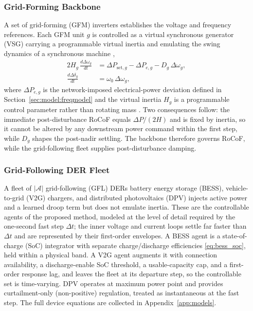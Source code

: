 \documentclass[lettersize,journal]{IEEEtran}
\begin{document}
\subsubsection{Grid-Forming Backbone}
A set of grid-forming (GFM) inverters establishes the voltage and frequency references. Each GFM unit $g$ is controlled as a virtual synchronous generator (VSG) carrying a programmable virtual inertia and emulating the swing dynamics of a synchronous machine \cite{hou2020adaptive,fathi2018extended,shadoul2022vsg,gurski2024aid},
\begin{align}
  2H_g\,\frac{d\Delta\omega_g}{dt}
    &= \Delta P_{\mathrm{set},g}-\Delta P_{e,g}-D_g\,\Delta\omega_g,
       \label{eq:vsg_swing}\\
  \frac{d\Delta\delta_g}{dt} &= \omega_0\,\Delta\omega_g,
       \label{eq:vsg_angle}
\end{align}
where $\Delta P_{e,g}$ is the network-imposed electrical-power deviation defined in Section~\ref{sec:model:freqmodel} and the virtual inertia $H_g$ is a programmable control parameter rather than rotating mass \cite{10638828}. Two consequences follow: the immediate post-disturbance RoCoF equals $\Delta P/(2H)$ and is fixed by inertia, so it cannot be altered by any downstream power command within the first step, while $D_g$ shapes the post-nadir settling. The backbone therefore governs RoCoF, while the grid-following fleet supplies post-disturbance damping.

\subsubsection{Grid-Following DER Fleet}
A fleet of $|\mathcal{A}|$ grid-following (GFL) DERs battery energy storage (BESS), vehicle-to-grid (V2G) chargers, and distributed photovoltaics (DPV) injects active power and a learned droop term but does not emulate inertia. These are the controllable agents of the proposed method, modeled at the level of detail required by the one-second fast step $\Delta t$; the inner voltage and current loops settle far faster than $\Delta t$ and are represented by their first-order envelopes. A BESS agent is a state-of-charge (SoC) integrator with separate charge/discharge efficiencies \eqref{eq:bess_soc}, held within a physical band. A V2G agent augments it with connection availability, a discharge-enable SoC threshold, a usable-capacity cap, and a first-order response lag, and leaves the fleet at its departure step, so the controllable set is time-varying. DPV operates at maximum power point and provides curtailment-only (non-positive) regulation, treated as instantaneous at the fast step. The full device equations are collected in Appendix~\ref{app:models}.
\end{document}
